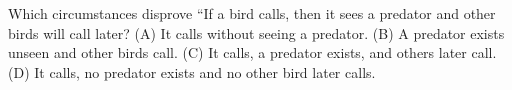 Which circumstances disprove ``If a bird calls, then it sees a predator and other birds will call later? (A) It calls without seeing a predator. (B) A predator exists unseen and other birds call. (C) It calls, a predator exists, and others later call. (D) It calls, no predator exists and no other bird later calls.
